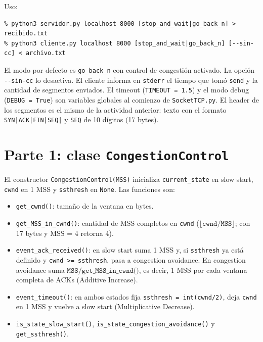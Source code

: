 \documentclass[11pt,letterpaper]{article}
\begin{document}
Uso:

\begin{lstlisting}
% python3 servidor.py localhost 8000 [stop_and_wait|go_back_n] > recibido.txt
% python3 cliente.py localhost 8000 [stop_and_wait|go_back_n] [--sin-cc] < archivo.txt
\end{lstlisting}

El modo por defecto es \texttt{go\_back\_n} con control de congestión activado. La
opción \texttt{-{}-sin-cc} lo desactiva. El cliente informa en \texttt{stderr} el tiempo
que tomó \texttt{send} y la cantidad de segmentos enviados. El timeout
(\texttt{TIMEOUT = 1.5}) y el modo debug (\texttt{DEBUG = True}) son variables globales
al comienzo de \texttt{SocketTCP.py}. El header de los segmentos es el mismo de la actividad anterior:
texto con el formato \texttt{SYN|ACK|FIN|SEQ|} y \texttt{SEQ} de 10 dígitos (17 bytes).

\section{Parte 1: clase \texttt{CongestionControl}}

El constructor \texttt{CongestionControl(MSS)} inicializa \texttt{current\_state} en slow
start, \texttt{cwnd} en 1 MSS y \texttt{ssthresh} en \texttt{None}. Las funciones son:

\begin{itemize}[nosep]
  \item \texttt{get\_cwnd()}: tamaño de la ventana en bytes.
  \item \texttt{get\_MSS\_in\_cwnd()}: cantidad de MSS completos en \texttt{cwnd}
        ($\lfloor \texttt{cwnd}/\texttt{MSS} \rfloor$; con 17 bytes y MSS = 4 retorna 4).
  \item \texttt{event\_ack\_received()}: en slow start suma 1 MSS y, si
        \texttt{ssthresh} ya está definido y \texttt{cwnd >= ssthresh}, pasa a congestion
        avoidance. En congestion avoidance suma
        $\texttt{MSS}/\texttt{get\_MSS\_in\_cwnd()}$, es decir, 1 MSS por cada ventana
        completa de ACKs (Additive Increase).
  \item \texttt{event\_timeout()}: en ambos estados fija
        \texttt{ssthresh = int(cwnd/2)}, deja \texttt{cwnd} en 1 MSS y vuelve a slow start
        (Multiplicative Decrease).
  \item \texttt{is\_state\_slow\_start()}, \texttt{is\_state\_congestion\_avoidance()} y
        \texttt{get\_ssthresh()}.
\end{itemize}
\end{document}
